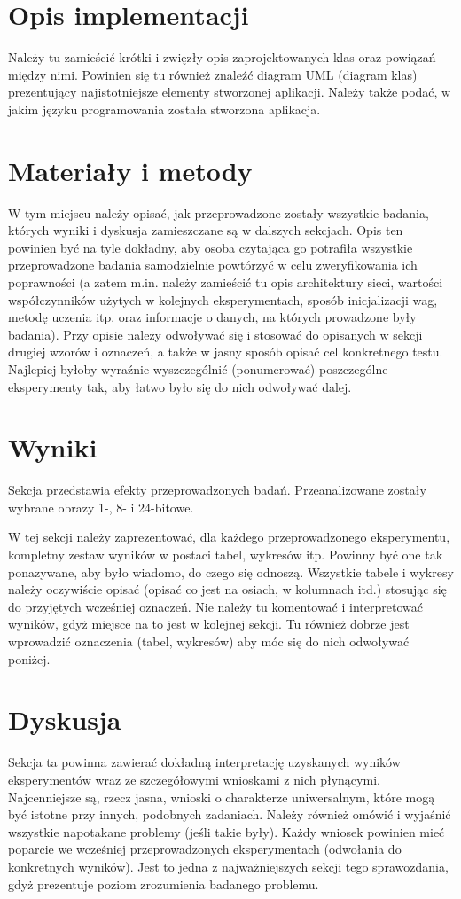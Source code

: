 \documentclass{classrep}
\begin{document}
\section{Opis implementacji}
{\color{blue}
Należy tu zamieścić krótki i zwięzły opis zaprojektowanych klas oraz powiązań
między nimi. Powinien się tu również znaleźć diagram UML  (diagram klas)
prezentujący najistotniejsze elementy stworzonej aplikacji. Należy także
podać, w jakim języku programowania została stworzona aplikacja. }

\section{Materiały i metody}
{\color{blue}
W tym miejscu należy opisać, jak przeprowadzone zostały wszystkie badania,
których wyniki i dyskusja zamieszczane są w dalszych sekcjach. Opis ten
powinien być na tyle dokładny, aby osoba czytająca go potrafiła wszystkie
przeprowadzone badania samodzielnie powtórzyć w celu zweryfikowania ich
poprawności (a zatem m.in. należy zamieścić tu opis architektury sieci,
wartości współczynników użytych w kolejnych eksperymentach, sposób
inicjalizacji wag, metodę uczenia itp. oraz informacje o danych, na których
prowadzone były badania). Przy opisie należy odwoływać się i stosować do
opisanych w sekcji drugiej wzorów i oznaczeń, a także w jasny sposób opisać
cel konkretnego testu. Najlepiej byłoby wyraźnie wyszczególnić (ponumerować)
poszczególne eksperymenty tak, aby łatwo było się do nich odwoływać dalej.}

\section{Wyniki}
Sekcja przedstawia efekty przeprowadzonych badań. Przeanalizowane zostały wybrane obrazy 1-, 8- i 24-bitowe.

{\color{blue}
W tej sekcji należy zaprezentować, dla każdego przeprowadzonego eksperymentu,
kompletny zestaw wyników w postaci tabel, wykresów itp. Powinny być one tak
ponazywane, aby było wiadomo, do czego się odnoszą. Wszystkie tabele i wykresy
należy oczywiście opisać (opisać co jest na osiach, w kolumnach itd.) stosując
się do przyjętych wcześniej oznaczeń. Nie należy tu komentować i interpretować
wyników, gdyż miejsce na to jest w kolejnej sekcji. Tu również dobrze jest
wprowadzić oznaczenia (tabel, wykresów) aby móc się do nich odwoływać
poniżej.}

\section{Dyskusja}
{\color{blue}
Sekcja ta powinna zawierać dokładną interpretację uzyskanych wyników
eksperymentów wraz ze szczegółowymi wnioskami z nich płynącymi. Najcenniejsze
są, rzecz jasna, wnioski o charakterze uniwersalnym, które mogą być istotne
przy innych, podobnych zadaniach. Należy również omówić i wyjaśnić wszystkie
napotakane problemy (jeśli takie były). Każdy wniosek powinien mieć poparcie
we wcześniej przeprowadzonych eksperymentach (odwołania do konkretnych
wyników). Jest to jedna z najważniejszych sekcji tego sprawozdania, gdyż
prezentuje poziom zrozumienia badanego problemu.}
\end{document}
